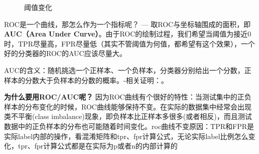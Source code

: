 \begin{figure}[h]
	\centering
	\quad
	\caption{阈值变化}
	\label{fig:threshold-change}
\end{figure}
ROC是一个曲线，那怎么作为一个指标呢？ --- 取ROC与坐标轴围成的面积，即\textbf{AUC（Area Under Curve）}。由于ROC的绘制过程，我们希望当阈值为接近0时，TPR尽量高，FPR尽量低（其实不管阈值为何值，都希望有这个效果），一个好的分类器的ROC的AUC应该尽量大。

AUC的含义：随机挑选一个正样本、一个负样本，分类器分别给出一个分数，正样本的分数大于负样本的分数的概率。-相关证明：\href{http://vividfree.github.io/%E6%9C%BA%E5%99%A8%E5%AD%A6%E4%B9%A0/2015/11/20/understanding-ROC-and-AUC}{\tbc{red}{理解 ROC 和 AUC}}。

\textbf{为什么要用ROC/AUC呢？}\newline
因为ROC曲线有个很好的特性：当测试集中的正负样本的分布变化的时候，ROC曲线能够保持不变。在实际的数据集中经常会出现类不平衡(class imbalance)现象，即负样本比正样本多很多(或者相反)，而且测试数据中的正负样本的分布也可能随着时间变化。roc曲线不变原因：TPR和FPR是实际label内部的操作，看混淆矩阵和tpr、fpr计算公式，无论实际label比例怎么变化，tpr、fpr计算公式都是在实际为p或者n的内部计算的

